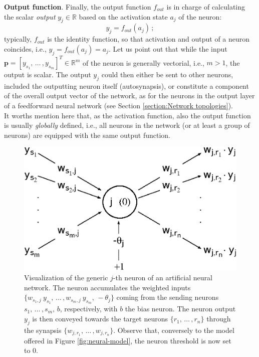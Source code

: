 \documentclass[12pt, a4paper, twoside, openright]{report}
\numberwithin{equation}{chapter}
\theoremstyle{theorem}
\theoremstyle{definition}
\theoremstyle{remark}
\theoremstyle{proposition}
\numberwithin{figure}{chapter}
\begin{document}
		\noindent \textbf{Output function}. Finally, the output function $f_{out}$ is in charge of calculating the scalar \emph{output} $y_j \in \mathbb{R}$ based on the activation state $a_j$ of the neuron:
		\begin{equation}
			\label{eq:output-function}
			y_j = f_{out}(a_j) \, ;
		\end{equation} 
		typically, $f_{out}$ is the identity function, so that activation and output of a neuron coincides, i.e., $y_j = f_{out}(a_j) = a_j$. Let us point out that while the input $\boldsymbol{p} = [y_{s_1}, \, \ldots \, , y_{s_m}]^T \in \mathbb{R}^m$ of the neuron is generally vectorial, i.e., $m > 1$, the output is scalar. The output $y_j$ could then either be sent to other neurons, included the outputting neuron itself (autosynapsis), or constitute a component of the overall output vector of the network, as for the neurons in the output layer of a feedforward neural network (see Section \ref{section:Network topologies}). \\
		It worths mention here that, as the activation function, also the output function is usually \emph{globally} defined, i.e., all neurons in the network (or at least a group of neurons) are equipped with the same output function.
		
		\begin{figure}[t]
			\center
			\includegraphics[scale = 0.6]{neural_model_bias.eps}
			
			\caption{Visualization of the generic $j$-th neuron of an artificial neural network. The neuron accumulates the weighted inputs $\big\lbrace w_{s_1,j} ~ y_{s_1}, \, \ldots \, , w_{s_m,j} ~ y_{s_m}, \, -\theta_j \big\rbrace$ coming from the sending neurons $s_1, \, \ldots \, , s_m, \, b$, respectively, with $b$ the bias neuron. The neuron output $y_j$ is then conveyed towards the target neurons $\big\lbrace r_1, \, \ldots \, , r_n \big\rbrace$ through the synapsis $\big\lbrace w_{j,r_1}, \, \ldots \, , w_{j,r_n} \big\rbrace$. Observe that, conversely to the model offered in Figure \ref{fig:neural-model}, the neuron threshold is now set to $0$.} 
			\label{fig:neural-model-bias}
		\end{figure}
		
\end{document}

